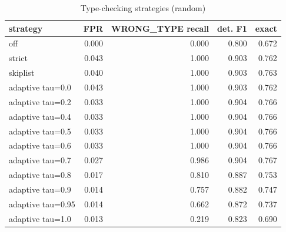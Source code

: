 \begin{table}[t]
\centering
\caption{Type-checking strategies (random)}
\label{tab:type_strategies_random}
\begin{tabular}{lrrrr}
\hline
strategy & FPR & WRONG\_TYPE recall & det. F1 & exact \\
\hline
off & 0.000 & 0.000 & 0.800 & 0.672 \\
strict & 0.043 & 1.000 & 0.903 & 0.762 \\
skiplist & 0.040 & 1.000 & 0.903 & 0.763 \\
adaptive tau=0.0 & 0.043 & 1.000 & 0.903 & 0.762 \\
adaptive tau=0.2 & 0.033 & 1.000 & 0.904 & 0.766 \\
adaptive tau=0.4 & 0.033 & 1.000 & 0.904 & 0.766 \\
adaptive tau=0.5 & 0.033 & 1.000 & 0.904 & 0.766 \\
adaptive tau=0.6 & 0.033 & 1.000 & 0.904 & 0.766 \\
adaptive tau=0.7 & 0.027 & 0.986 & 0.904 & 0.767 \\
adaptive tau=0.8 & 0.017 & 0.810 & 0.887 & 0.753 \\
adaptive tau=0.9 & 0.014 & 0.757 & 0.882 & 0.747 \\
adaptive tau=0.95 & 0.014 & 0.662 & 0.872 & 0.737 \\
adaptive tau=1.0 & 0.013 & 0.219 & 0.823 & 0.690 \\
\hline
\end{tabular}
\end{table}
